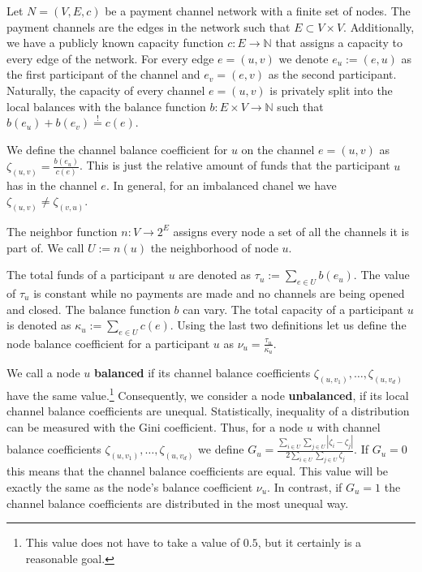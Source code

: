 \documentclass[conference]{IEEEtran}
\begin{document}
Let $N=(V,E,c)$ be a payment channel network with a finite set of nodes.
The payment channels are the edges in the network such that $E\subset V\times V$.
Additionally, we have a publicly known capacity function $c: E\longrightarrow \mathbb{N}$ that assigns a capacity to every edge of the network.
For every edge $e=(u,v)$ we denote $e_u:=(e,u)$ as the first participant of the channel and $e_v=(e,v)$ as the second participant.
Naturally, the capacity of every channel $e=(u,v)$ is privately split into the local balances with the balance function $b: E\times V\longrightarrow\mathbb{N}$ such that $b(e_u)+b(e_v)\stackrel{!}{=}c(e)$.

We define the channel balance coefficient for $u$ on the channel $e=(u,v)$ as  $\zeta_{(u,v)} = \frac{b(e_u)}{c(e)}$.
This is just the relative amount of funds that the participant $u$ has in the channel $e$.
In general, for an imbalanced chanel we have $\zeta_{(u,v)} \neq \zeta_{(v,u)}$.

The neighbor function $n : V \longrightarrow 2^{E}$ assigns every node a set of all the channels it is part of.
We call $U:=n(u)$ the neighborhood of node $u$.

The total funds of a participant $u$ are denoted as $\tau_u:=\displaystyle{\sum_{e\in U}b(e_u)}$.
The value of $\tau_u$ is constant while no payments are made and no channels are being opened and closed.
The balance function $b$ can vary.
The total capacity of a participant $u$ is denoted as $\kappa_u:=\displaystyle{\sum_{e\in U}c(e)}$.
Using the last two definitions let us define the node balance coefficient for a participant $u$ as $\nu_u = \frac{\tau_u}{\kappa_u}$.

We call a node $u$ {\bf balanced} if its channel balance coefficients $\zeta_{(u,v_1)},\dots,\zeta_{(u,v_d)}$ have the same value.\footnote{This value does not have to take a value of $0.5$, but it certainly is a reasonable goal.}
Consequently, we consider a node {\bf unbalanced}, if its local channel balance coefficients are unequal.
Statistically, inequality of a distribution can be measured with the Gini coefficient.
Thus, for a node $u$ with channel balance coefficients $\zeta_{(u,v_1)},\dots,\zeta_{(u,v_d)}$ we define $G_u = \frac{\displaystyle{\sum_{i\in U} \sum_{j \in U}} | \zeta_i - \zeta_j |}{2 \displaystyle{\sum_{i \in U} \sum_{j \in U} \zeta_j}}$.
If $G_u = 0$ this means that the channel balance coefficients are equal.
This value will be exactly the same as the node's balance coefficient $\nu_u$.
In contrast, if $G_u = 1$ the channel balance coefficients are distributed in the most unequal way.
\end{document}
